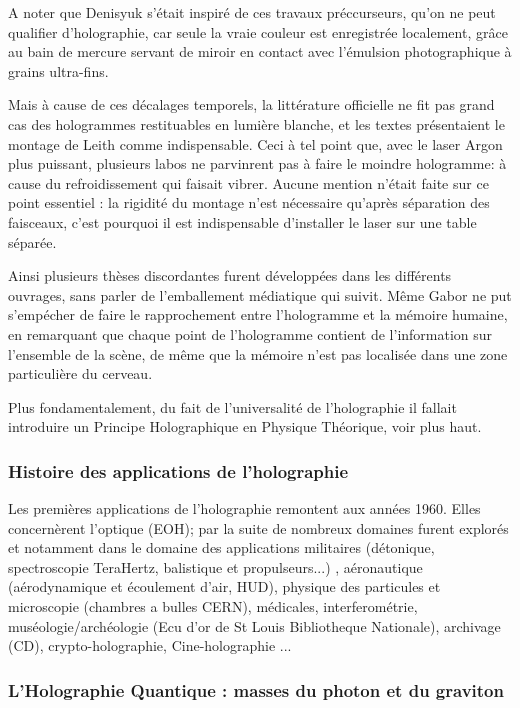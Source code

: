 \documentclass[a4paper,12pt]{article}
\begin{document}
A noter que Denisyuk s'était inspiré de ces travaux préccurseurs, qu'on ne peut qualifier d'holographie, car seule la vraie couleur est enregistrée localement, gr\^ace au bain de mercure servant de miroir en contact avec l'émulsion photographique à grains ultra-fins.


Mais à cause de ces décalages temporels, la littérature officielle ne fit pas grand cas des hologrammes restituables en lumière blanche, et les textes présentaient le montage de Leith comme indispensable. Ceci à tel point que, avec le laser Argon plus puissant, plusieurs labos ne parvinrent pas à faire le moindre hologramme: à cause du refroidissement qui faisait vibrer. Aucune mention n'était faite sur ce point essentiel : la rigidité du montage n'est nécessaire qu'après séparation des faisceaux, c'est pourquoi il est indispensable d'installer le laser sur une table séparée.


Ainsi plusieurs thèses discordantes furent développées dans les différents ouvrages, sans parler de l'emballement médiatique qui suivit. Même Gabor ne put s'empécher de faire le rapprochement entre l'hologramme et la mémoire humaine, en remarquant que chaque point de l'hologramme contient de l'information sur l'ensemble de la scène, de même que la mémoire n'est pas localisée dans une zone particulière du cerveau.


Plus fondamentalement, du fait de l'universalité de l'holographie il fallait introduire un Principe Holographique en Physique Théorique, voir plus haut.




\subsubsection{Histoire des applications de l'holographie}

Les premières applications de l'holographie remontent aux années 1960. Elles concernèrent l'optique (EOH); par la suite de nombreux domaines furent explorés et notamment dans le domaine des applications militaires (détonique, spectroscopie TeraHertz, balistique et propulseurs...) \cite{ISL}, aéronautique (aérodynamique et écoulement d'air, HUD), physique des particules et microscopie (chambres a bulles CERN), médicales, interferométrie, muséologie/archéologie (Ecu d'or de St Louis Bibliotheque Nationale), archivage (CD), crypto-holographie, Cine-holographie \cite{Bjelkhagen} ...



\subsubsection{L'Holographie Quantique : masses du photon et du graviton}
\end{document}

